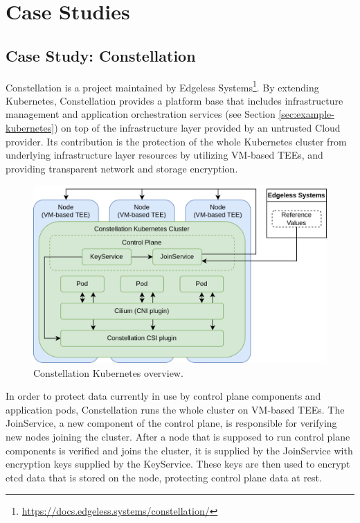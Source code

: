 \section{Case Studies}
\label{sec:case-studies}

\subsection{Case Study: Constellation}

Constellation is a project maintained by Edgeless
Systems\footnote{\url{https://docs.edgeless.systems/constellation/}}. By
extending Kubernetes, Constellation provides a platform base that includes
infrastructure management and application orchestration services (see Section
\ref{sec:example-kubernetes}) on top of the infrastructure layer provided by an
untrusted Cloud provider. Its contribution is the protection of the whole
Kubernetes cluster from underlying infrastructure layer resources by utilizing
VM-based TEEs, and providing transparent network and storage encryption.

\begin{figure}[H]
  \centering
  \includegraphics[width=0.8\linewidth]{resources/constellation-kubernetes.drawio.png}
  \caption{Constellation Kubernetes overview.}
\end{figure}

In order to protect data currently in use by control plane components and
application pods, Constellation runs the whole cluster on VM-based TEEs. The
JoinService, a new component of the control plane, is responsible for verifying
new nodes joining the cluster. After a node that is supposed to run control
plane components is verified and joins the cluster, it is supplied by the
JoinService with encryption keys supplied by the KeyService. These keys are then
used to encrypt etcd data that is stored on the node, protecting control plane
data at rest.

